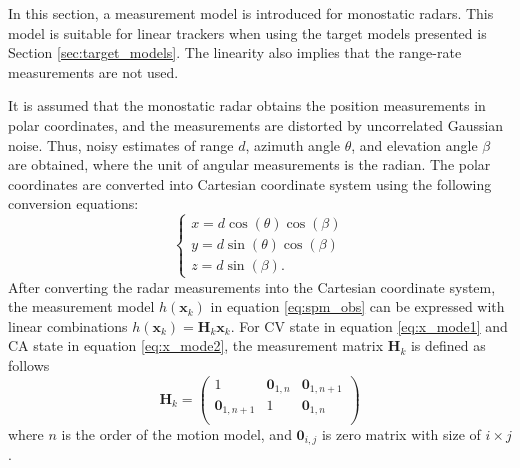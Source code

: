 \documentclass[english, 12pt, a4paper, elec, utf8, a-1b, online]{aaltothesis}
\numberwithin{equation}{section}
\renewcommand{\vec}[1]{\mathbf{#1}}
\newcommand{\x}{\vec{x}_k}
\newcommand{\omodel}{\vec{H}_k}
\begin{document}
In this section, a measurement model is introduced for monostatic radars.
This model is suitable for linear trackers when using the target models presented is Section \ref{sec:target_models}.
The linearity also implies that the range-rate measurements are not used.

It is assumed that the monostatic radar obtains the position measurements in polar coordinates, and the measurements are distorted by uncorrelated Gaussian noise.
Thus, noisy estimates of range $d$, azimuth angle $\theta$, and elevation angle $\beta$ are obtained, where the unit of angular measurements is the radian. 
The polar coordinates are converted into Cartesian coordinate system using the following conversion equations:
\begin{equation}
\left\{
\begin{array}{l}
    x = d \cos(\theta) \cos(\beta) \\
    y = d \sin(\theta) \cos(\beta) \\
    z = d \sin(\beta).
\end{array}\right.
\end{equation}
After converting the radar measurements into the Cartesian coordinate system, the measurement model $h(\x)$ in equation \eqref{eq:spm_obs} can be expressed with linear combinations $h(\x) = \omodel \x$.
For CV state in equation \eqref{eq:x_mode1} and CA state in equation \eqref{eq:x_mode2}, the measurement matrix $\omodel$ is defined as follows
\begin{equation}\label{eq:position_measurement_matrix}
    \omodel = 
       \begin{pmatrix}
            1 & \vec{0}_{1, n} & \vec{0}_{1, n+1}\\ 
            \vec{0}_{1, n+1} & 1 & \vec{0}_{1, n}\\ 
        \end{pmatrix}
\end{equation}
where $n$ is the order of the motion model, and $\vec{0}_{i,j}$ is zero matrix with size of $i\times j$.
\end{document}
